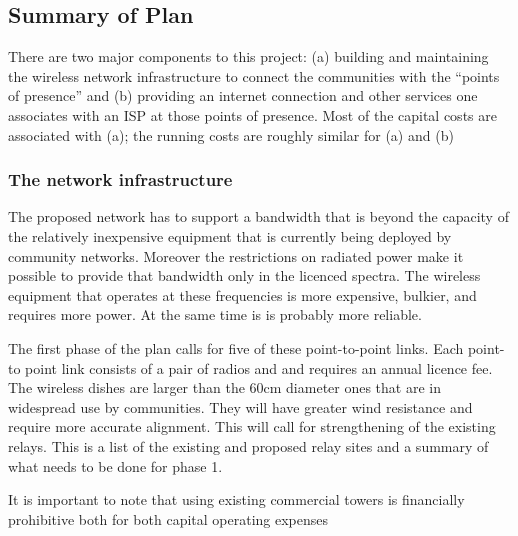 \subsection{Summary of Plan}

There are two major components to this project: (a) building and
maintaining the wireless network infrastructure to connect the
communities with the ``points of presence''  and (b) providing an
internet connection and other services one associates with an ISP at
those points of presence.  Most of the capital costs are associated
with (a); the running costs are roughly similar for (a) and (b)

\subsubsection{The network infrastructure}
The proposed network has to support a bandwidth  that is beyond the
capacity of the relatively inexpensive equipment that is currently
being deployed by community networks.  Moreover the restrictions on
radiated power make it possible to provide that bandwidth only in the
licenced spectra.  The wireless equipment that operates at these
frequencies is  more expensive, bulkier, and requires more power.  At
the same time is is probably more reliable.

The first phase of the plan calls for five of these point-to-point
links. Each point-to point link consists of a pair of radios and and
requires an annual licence fee.  The wireless dishes are larger than
the 60cm diameter ones that are in widespread use by communities. They
will have greater wind resistance and require more accurate
alignment.  This will call for strengthening of the existing relays.
This is a list of the existing and proposed relay sites and a summary
of what needs to be done for phase 1.

It is important to note that using existing commercial towers is
financially prohibitive both for both capital operating expenses

